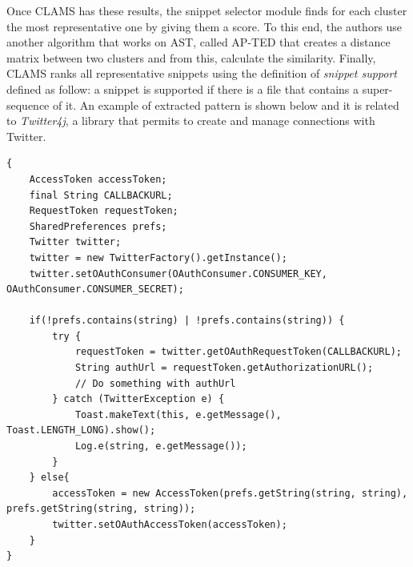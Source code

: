 Once CLAMS has these results, the snippet selector module finds for each 
cluster the most representative one by giving them a score. To this end, 
the authors use another algorithm that works on AST, called AP-TED that creates 
a distance matrix between two clusters and from this, calculate the similarity. 
Finally, CLAMS ranks all representative snippets using the definition of 
\textit{snippet support} defined as follow: a snippet is supported if there is 
a file that contains a super-sequence of it. An example of extracted pattern is 
shown below and it is related to \textit{Twitter4j}, a library that permits to 
create and manage connections with Twitter. 
\begin{lstlisting}
{
    AccessToken accessToken;
    final String CALLBACKURL;
    RequestToken requestToken;
    SharedPreferences prefs;
    Twitter twitter;
    twitter = new TwitterFactory().getInstance();
    twitter.setOAuthConsumer(OAuthConsumer.CONSUMER_KEY, OAuthConsumer.CONSUMER_SECRET);

    if(!prefs.contains(string) | !prefs.contains(string)) {
        try {
            requestToken = twitter.getOAuthRequestToken(CALLBACKURL);
            String authUrl = requestToken.getAuthorizationURL();
            // Do something with authUrl
        } catch (TwitterException e) {
            Toast.makeText(this, e.getMessage(), Toast.LENGTH_LONG).show();
            Log.e(string, e.getMessage());
        }
    } else{
        accessToken = new AccessToken(prefs.getString(string, string), prefs.getString(string, string));
        twitter.setOAuthAccessToken(accessToken);
    }
}
	
\end{lstlisting}

